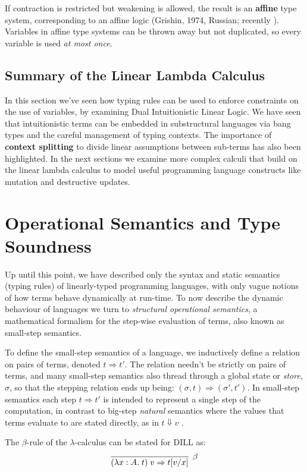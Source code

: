\documentclass[]{unswthesis}
\newcommand{\steps}{\Rightarrow}
\let\i\textit
\let\b\textbf
\begin{document}
If contraction is restricted but weakening is allowed, the result is an \b{affine} type system, corresponding to an affine logic (Grishin, 1974, Russian; recently \cite{tov11}). Variables in affine type systems can be thrown away but not duplicated, so every variable is used \i{at most once}.

\subsection{Summary of the Linear Lambda Calculus}

In this section we've seen how typing rules can be used to enforce constraints on the use of variables, by examining Dual Intuitionistic Linear Logic. We have seen that intuitionistic terms can be embedded in substructural languages via bang types and the careful management of typing contexts. The importance of \b{context splitting} to divide linear assumptions between sub-terms has also been highlighted. In the next sections we examine more complex calculi that build on the linear lambda calculus to model useful programming language constructs like mutation and destructive updates.

\section{Operational Semantics and Type Soundness}
\label{sec:op-sems-soundness}

Up until this point, we have described only the syntax and static semantics (typing rules) of linearly-typed programming languages, with only vague notions of how terms behave dynamically at run-time. To now describe the dynamic behaviour of languages we turn to \i{structural operational semantics}, a mathematical formalism for the step-wise evaluation of terms, also known as small-step semantics.

To define the small-step semantics of a language, we inductively define a relation on pairs of terms, denoted $t \steps t'$. The relation needn't be strictly on pairs of terms, and many small-step semantics also thread through a global state or \i{store}, $\sigma$, so that the stepping relation ends up being: $(\sigma, t) \steps (\sigma', t')$. In small-step semantics each step $t \steps t'$ is intended to represent a single step of the computation, in contrast to big-step \i{natural} semantics where the values that terms evaluate to are stated directly, as in $t \Downarrow v$ \cite{gunterSemantics}.

The $\beta$-rule of the $\lambda$-calculus can be stated for DILL as:
\begin{eqnarray*}
\infer[\beta]{(\lambda x : A. \; t) \; v \steps t[v/x]}{}
\end{eqnarray*}
\end{document}
